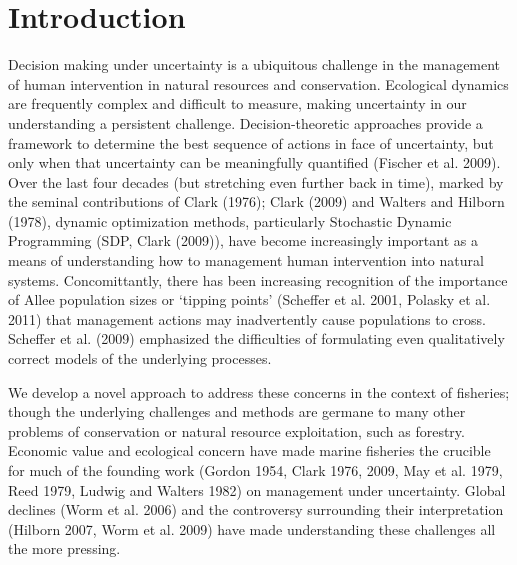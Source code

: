 \documentclass[author-year, 12pt,review]{elsarticle} %
\begin{document}
\section{Introduction}\label{introduction}

Decision making under uncertainty is a ubiquitous challenge in the
management of human intervention in natural resources and conservation.
Ecological dynamics are frequently complex and difficult to measure,
making uncertainty in our understanding a persistent challenge.
Decision-theoretic approaches provide a framework to determine the best
sequence of actions in face of uncertainty, but only when that
uncertainty can be meaningfully quantified (Fischer et al. 2009). Over
the last four decades (but stretching even further back in time), marked
by the seminal contributions of Clark (1976); Clark (2009) and Walters
and Hilborn (1978), dynamic optimization methods, particularly
Stochastic Dynamic Programming (SDP, Clark (2009)), have become
increasingly important as a means of understanding how to management
human intervention into natural systems. Concomittantly, there has been
increasing recognition of the importance of Allee population sizes or
`tipping points' (Scheffer et al. 2001, Polasky et al. 2011) that
management actions may inadvertently cause populations to cross.
Scheffer et al. (2009) emphasized the difficulties of formulating even
qualitatively correct models of the underlying processes.

We develop a novel approach to address these concerns in the context of
fisheries; though the underlying challenges and methods are germane to
many other problems of conservation or natural resource exploitation,
such as forestry. Economic value and ecological concern have made marine
fisheries the crucible for much of the founding work (Gordon 1954, Clark
1976, 2009, May et al. 1979, Reed 1979, Ludwig and Walters 1982) on
management under uncertainty. Global declines (Worm et al. 2006) and the
controversy surrounding their interpretation (Hilborn 2007, Worm et al.
2009) have made understanding these challenges all the more pressing.
\end{document}
